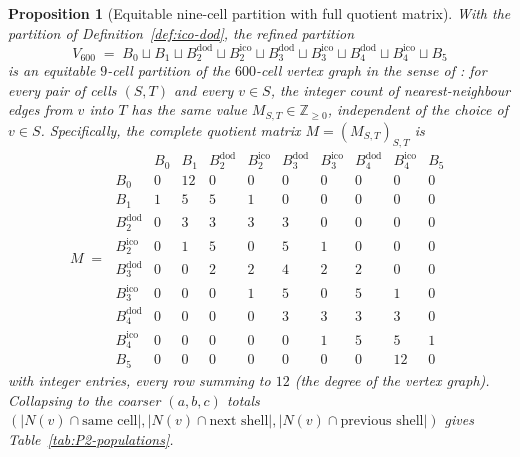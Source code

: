\documentclass[11pt, a4paper]{amsart}
\newtheorem{proposition}[theorem]{Proposition}
\theoremstyle{definition}
\newcommand{\Z}{\mathbb{Z}}
\begin{document}
\begin{proposition}[Equitable nine-cell partition with full quotient
matrix]\label{prop:dual-populations}
With the partition of Definition~\ref{def:ico-dod}, the refined
partition
\[
  V_{600} \;=\; B_0 \sqcup B_1 \sqcup B_2^{\mathrm{dod}} \sqcup
    B_2^{\mathrm{ico}} \sqcup B_3^{\mathrm{dod}} \sqcup
    B_3^{\mathrm{ico}} \sqcup B_4^{\mathrm{dod}} \sqcup
    B_4^{\mathrm{ico}} \sqcup B_5
\]
is an equitable $9$-cell partition of the $600$-cell vertex graph
in the sense of \cite[\S 9.3]{GodsilRoyle2001}: for every pair of
cells $(S, T)$ and every $v \in S$, the integer count of
nearest-neighbour edges from $v$ into $T$ has the same value
$M_{S, T} \in \Z_{\geq 0}$, independent of the choice of $v \in
S$. Specifically, the complete quotient matrix $M = (M_{S,
T})_{S, T}$ is
\begin{equation}\label{eq:quotient-matrix}
M \;=\;
\begin{array}{c|ccccccccc}
 & B_0 & B_1 & B_2^{\mathrm{dod}} & B_2^{\mathrm{ico}} &
   B_3^{\mathrm{dod}} & B_3^{\mathrm{ico}} &
   B_4^{\mathrm{dod}} & B_4^{\mathrm{ico}} & B_5 \\
\hline
B_0                & 0 & 12 & 0 & 0 & 0 & 0 & 0 & 0  & 0 \\
B_1                & 1 & 5  & 5 & 1 & 0 & 0 & 0 & 0  & 0 \\
B_2^{\mathrm{dod}} & 0 & 3  & 3 & 3 & 3 & 0 & 0 & 0  & 0 \\
B_2^{\mathrm{ico}} & 0 & 1  & 5 & 0 & 5 & 1 & 0 & 0  & 0 \\
B_3^{\mathrm{dod}} & 0 & 0  & 2 & 2 & 4 & 2 & 2 & 0  & 0 \\
B_3^{\mathrm{ico}} & 0 & 0  & 0 & 1 & 5 & 0 & 5 & 1  & 0 \\
B_4^{\mathrm{dod}} & 0 & 0  & 0 & 0 & 3 & 3 & 3 & 3  & 0 \\
B_4^{\mathrm{ico}} & 0 & 0  & 0 & 0 & 0 & 1 & 5 & 5  & 1 \\
B_5                & 0 & 0  & 0 & 0 & 0 & 0 & 0 & 12 & 0
\end{array}
\end{equation}
with integer entries, every row summing to $12$ (the degree of the
vertex graph). Collapsing to the coarser $(a, b, c)$ totals
$(|N(v) \cap \text{same cell}|, |N(v) \cap \text{next shell}|,
|N(v) \cap \text{previous shell}|)$ gives
Table~\ref{tab:P2-populations}.
\end{proposition}
\end{document}

